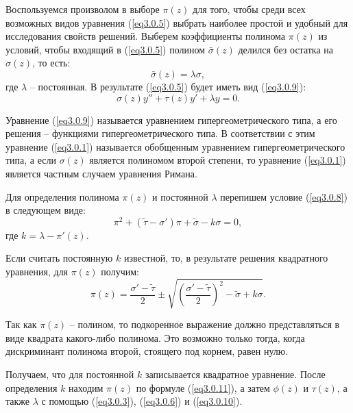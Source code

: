 Воспользуемся произволом в выборе \( \pi(z) \) для того, чтобы среди всех
возможных видов уравнения (\ref{eq3.0.5}) выбрать наиболее простой и удобный для
исследования свойств решений. Выберем коэффициенты полинома \( \pi(z) \) из
условий, чтобы входящий в (\ref{eq3.0.5}) полином \( \bar{\sigma}(z) \) делился
без остатка на \( \sigma(z) \), то есть:
\begin{equation}
    \bar{\sigma}(z) = \lambda\sigma,
    \label{eq3.0.8}
\end{equation}
где \( \lambda \) -- постоянная. В результате (\ref{eq3.0.5}) будет иметь вид
(\ref{eq3.0.9}):
\begin{equation}
    \sigma(z)y'' + \tau(z)y' + \lambda y = 0.
    \label{eq3.0.9}
\end{equation}

Уравнение (\ref{eq3.0.9}) называется уравнением гипергеометрического типа, а его
решения -- функциями гипергеометрического типа. В соответствии с этим уравнение
(\ref{eq3.0.1}) называется обобщенным уравнением гипергеометрического типа,
а если \( \sigma(z) \) является полиномом второй степени, то уравнение
(\ref{eq3.0.1}) является частным случаем уравнения Римана.

Для определения полинома \( \pi(z) \) и постоянной \( \lambda \) перепишем
условие (\ref{eq3.0.8}) в следующем виде:
\begin{equation}
    \pi^2 + (\tilde{\tau} - \sigma')\pi + \tilde{\sigma} - k\sigma = 0,
    \label{eq3.0.10}
\end{equation}
где \( k = \lambda - \pi'(z) \).

Если считать постоянную \( k \) известной, то, в результате решения квадратного
уравнения, для \( \pi(z) \) получим:
\begin{equation}
    \pi(z) = \frac{\sigma' - \tilde{\tau}}{2} \pm \sqrt{\left(\frac{\sigma' - \tilde{\tau}}{2}\right)^2 - \tilde{\sigma} + k\sigma}.
    \label{eq3.0.11}
\end{equation}

Так как \( \pi(z) \) -- полином, то подкоренное выражение должно представляться
в виде квадрата какого-либо полинома. Это возможно только тогда, когда
дискриминант полинома второй, стоящего под корнем, равен нулю.

Получаем, что для постоянной \( k \) записывается квадратное уравнение. После
определения \( k \) находим \( \pi(z) \) по формуле (\ref{eq3.0.11}), а затем
\( \phi(z) \) и \( \tau(z) \), а также \( \lambda \) с помощью (\ref{eq3.0.3}),
(\ref{eq3.0.6}) и (\ref{eq3.0.10}).

